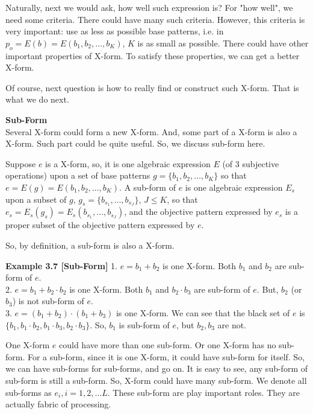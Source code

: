 Naturally, next we would ask, how well such expression is? For "how well", we need some criteria. There could have many such criteria. However, this criteria is very important: use as less as possible base patterns, i.e. in $p_o = E(b) = E(b_1, b_2, \ldots, b_K)$, $K$ is as small as possible. There could have other important properties of X-form. To satisfy these properties, we can get a better X-form.

Of course, next question is how to really find or construct such X-form. That is what we do next. 
\bigskip



{\bf Sub-Form} \\
Several X-form could form a new X-form. And, some part of a X-form is also a X-form. Such part could be quite useful. So, we discuss sub-form here. 



\begin{definition}
Suppose $e$ is a X-form, so, it is one algebraic expression $E$ (of 3 subjective operations) upon a set of base patterns $g = \{b_1, b_2, \ldots, b_K\}$ so that $e = E(g) = E(b_1, b_2, \ldots, b_K)$. A sub-form of $e$ is one algebraic expression $E_s$ upon a subset of $g$, $g_s = \{b_{s_1}, \ldots, b_{s_J}\}$,  $J \le K$, so that $e_s = E_s(g_s) = E_s(b_{s_1}, \ldots, b_{s_J})$, and the objective pattern expressed by $e_s$ is a proper subset of the objective pattern expressed by $e$.
\end{definition}
So, by definition, a sub-form is also a X-form. 

{\bf Example 3.7 [\bf  Sub-Form]}
1. $e = b_1 + b_2$ is one X-form. Both $b_1$ and $b_2$ are sub-form of $e$. \\
2. $e = b_1 + b_2 \cdot b_2$ is one X-form. Both $b_1$ and $b_2 \cdot b_3$ are sub-form of $e$. But, $b_2$ (or $b_3$) is not sub-form of $e$. \\
3. $e = (b_1 + b_2) \cdot (b_1 + b_3)$ is one X-form. We can see that the black set of $e$ is $\{b_1, b_1 \cdot b_2, b_1 \cdot b_3, b_2 \cdot b_3 \}$. So, $b_1$ is sub-form of $e$, but $b_2, b_3$ are not.   



One X-form $e$ could have more than one sub-form. Or one X-form has no sub-form. For a sub-form, since it is one X-form, it could have sub-form for itself. So, we can have sub-forms for sub-forms, and go on. It is easy to see, any sub-form of sub-form is still a sub-form. So, X-form could have many sub-form. We denote all sub-forms as $e_i, i = 1, 2, \ldots L$. These sub-form are play important roles. They are actually fabric of processing. 


